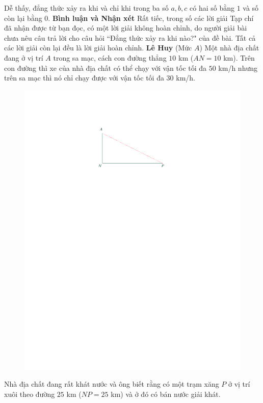 \begin{multicols}{2}
	\vskip 0.05cm
	Dễ thấy, đẳng thức xảy ra khi và chỉ khi trong ba số $a, b, c$ có hai số bằng $1$ và số còn lại bằng $0$.
	\vskip 0.05cm
	\textbf{\color{thachthuctoanhoc}Bình luận và Nhận xét}
	\vskip 0.05cm
	Rất tiếc, trong số các lời giải Tạp chí đã nhận được từ bạn đọc, có một lời giải không hoàn chỉnh, do người giải bài chưa nêu câu trả lời cho câu hỏi ``Đẳng thức xảy ra khi nào?" của đề bài. Tất cả các lời giải còn lại đều là lời giải hoàn chỉnh.
	\vskip 0.05cm
	\hfill	\textbf{\color{thachthuctoanhoc}Lê Huy}
	\vskip 0.05cm
	{}
	(Mức $A$) 
	Một nhà địa chất đang ở vị trí $A$ trong sa mạc, cách con đường thẳng $10$ km ($AN = 10$ km). Trên con đường thì xe của nhà địa chất có thể chạy với vận tốc tối đa $50$ km/h nhưng trên sa mạc thì nó chỉ chạy được với vận tốc tối đa $30$ km/h. 
	\begin{figure}[H]
		\centering
		\vspace*{-10pt}
		\captionsetup{labelformat= empty, justification=centering}
		\includegraphics[width=0.8\linewidth]{P597}
		\vspace*{-10pt}
	\end{figure}
	Nhà địa chất đang rất khát nước và ông biết rằng có một trạm xăng $P$ ở vị trí xuôi theo đường $25$ km ($NP = 25$ km) và ở đó có bán nước giải khát.  

\end{multicols}
